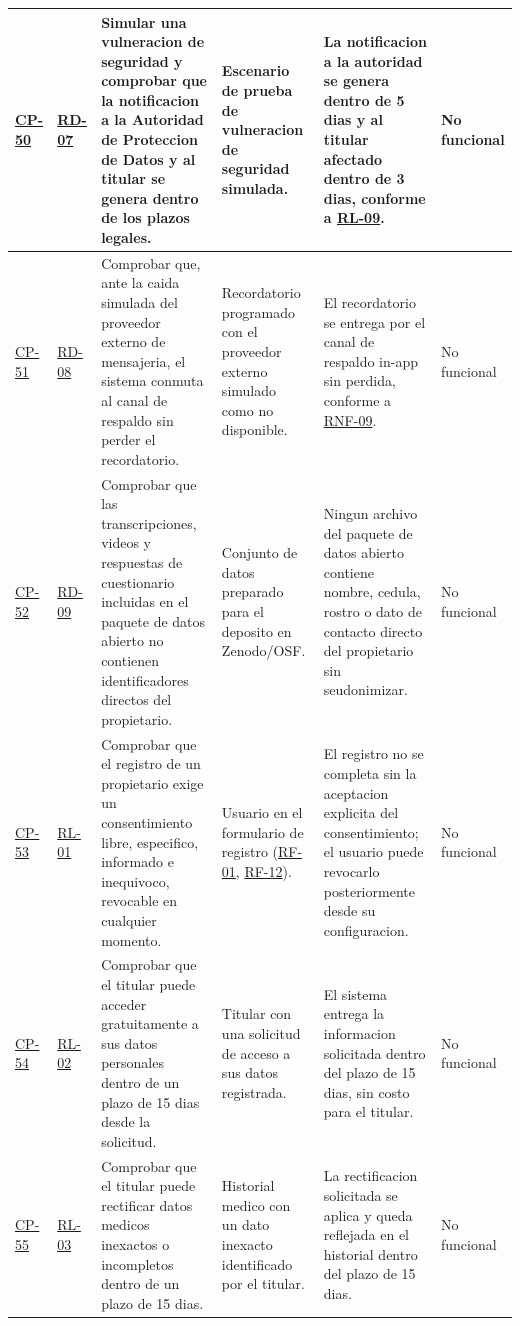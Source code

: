 \documentclass[journal,onecolumn]{IEEEtran}
\begin{document}
\begin{landscape}
\begin{longtable}{@{}p{1.3cm} p{1.3cm} p{4.6cm} p{3.6cm} p{5.2cm} p{1.6cm}@{}}
			\hyperref[cp:50]{CP-50}\label{cp:50} & \hyperref[tab:RD-07]{RD-07} & Simular una vulneracion de seguridad y comprobar que la notificacion a la Autoridad de Proteccion de Datos y al titular se genera dentro de los plazos legales. & Escenario de prueba de vulneracion de seguridad simulada. & La notificacion a la autoridad se genera dentro de 5 dias y al titular afectado dentro de 3 dias, conforme a \hyperref[rl:09]{RL-09}. & No funcional \\ \midrule
			\hyperref[cp:51]{CP-51}\label{cp:51} & \hyperref[tab:RD-08]{RD-08} & Comprobar que, ante la caida simulada del proveedor externo de mensajeria, el sistema conmuta al canal de respaldo sin perder el recordatorio. & Recordatorio programado con el proveedor externo simulado como no disponible. & El recordatorio se entrega por el canal de respaldo in-app sin perdida, conforme a \hyperref[tab:RNF-09]{RNF-09}. & No funcional \\ \midrule
			\hyperref[cp:52]{CP-52}\label{cp:52} & \hyperref[tab:RD-09]{RD-09} & Comprobar que las transcripciones, videos y respuestas de cuestionario incluidas en el paquete de datos abierto no contienen identificadores directos del propietario. & Conjunto de datos preparado para el deposito en Zenodo/OSF. & Ningun archivo del paquete de datos abierto contiene nombre, cedula, rostro o dato de contacto directo del propietario sin seudonimizar. & No funcional \\ \midrule
			\hyperref[cp:53]{CP-53}\label{cp:53} & \hyperref[rl:01]{RL-01} & Comprobar que el registro de un propietario exige un consentimiento libre, especifico, informado e inequivoco, revocable en cualquier momento. & Usuario en el formulario de registro (\hyperref[tab:RF-01]{RF-01}, \hyperref[tab:RF-12]{RF-12}). & El registro no se completa sin la aceptacion explicita del consentimiento; el usuario puede revocarlo posteriormente desde su configuracion. & No funcional \\ \midrule
			\hyperref[cp:54]{CP-54}\label{cp:54} & \hyperref[rl:02]{RL-02} & Comprobar que el titular puede acceder gratuitamente a sus datos personales dentro de un plazo de 15 dias desde la solicitud. & Titular con una solicitud de acceso a sus datos registrada. & El sistema entrega la informacion solicitada dentro del plazo de 15 dias, sin costo para el titular. & No funcional \\ \midrule
			\hyperref[cp:55]{CP-55}\label{cp:55} & \hyperref[rl:03]{RL-03} & Comprobar que el titular puede rectificar datos medicos inexactos o incompletos dentro de un plazo de 15 dias. & Historial medico con un dato inexacto identificado por el titular. & La rectificacion solicitada se aplica y queda reflejada en el historial dentro del plazo de 15 dias. & No funcional \\ \midrule

\end{longtable}
\end{landscape}
\end{document}
